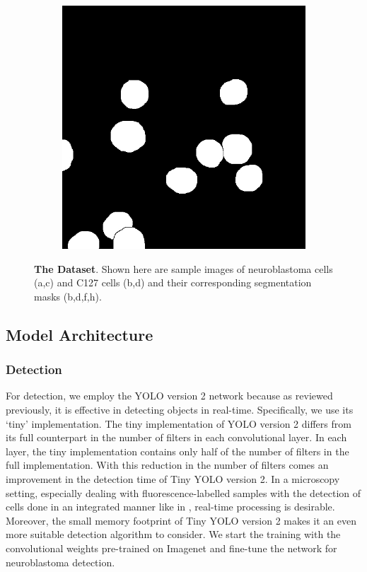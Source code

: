 \documentclass[journal]{IEEEtran}
\begin{document}
\begin{figure}
\begin{subfigure}[b]{0.24\linewidth}
\caption{}
\end{subfigure}
\begin{subfigure}[b]{0.24\linewidth}
\includegraphics[width=\linewidth]{c127/108641-label.jpg}
\caption{}
\end{subfigure}
\caption{\textbf{The Dataset}. Shown here are sample images of neuroblastoma cells (a,c) and C127 cells (b,d) and their corresponding segmentation masks (b,d,f,h). }
\end{figure}
\subsection{Model Architecture}
\subsubsection{Detection}
For detection, we employ the YOLO version 2 network because as reviewed previously, it is effective in detecting objects in real-time. Specifically, we use its `tiny' implementation. The tiny implementation of YOLO version 2 differs from its full counterpart in the number of filters in each convolutional layer. In each layer, the tiny implementation contains only half of the number of filters in the full implementation. With this reduction in the number of filters comes an improvement in the detection time of Tiny YOLO version 2. In a microscopy setting, especially dealing with fluorescence-labelled samples with the detection of cells done in an integrated manner like in \cite{Waithe544833}, real-time processing is desirable. Moreover, the small memory footprint of Tiny YOLO version 2 makes it an even more suitable detection algorithm to consider. We start the training with the convolutional weights pre-trained on Imagenet and fine-tune the network for neuroblastoma detection.
\end{document}

